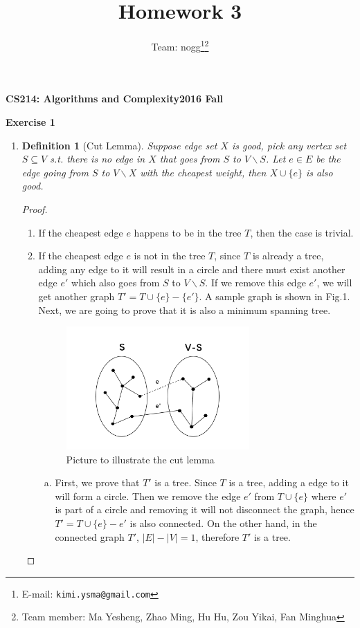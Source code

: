 \documentclass[12pt, notitlepage]{article}
\title{Homework 3}
\author{Team: nogg\footnote{E-mail: \texttt{kimi.ysma@gmail.com}}\footnote{Team member: Ma Yesheng, Zhao Ming, Hu Hu, Zou Yikai, Fan Minghua}}
\newtheorem{defi}{Definition}
\begin{document}
{\bf\small CS214: Algorithms and Complexity}\hfill{\bf\small 2016 Fall}
{\let\newpage\relax\maketitle}


\textbf{Exercise 1}
\begin{enumerate}
\item
\begin{defi}[Cut Lemma]
\vspace{-0.85cm}
Suppose edge set $X$ is good, pick any vertex set $S\subseteq V$ s.t. there is no edge in $X$ that goes from $S$ to $V\backslash S$. Let $e\in E$ be the edge going from $S$ to  $V\backslash X$ with the cheapest weight, then $X\cup \{e\}$ is also good.
\end{defi}
\begin{proof}
	\mbox{ }
\begin{enumerate}[(1)]
	\item If the cheapest edge $e$ happens to be in the tree $T$, then the case is trivial.
	\item If the cheapest edge $e$ is not in the tree $T$, since $T$ is already a tree, adding any edge to it will result in a circle and there must exist another edge $e'$ which also goes from $S$ to  $V\backslash S$. If we remove this edge $e'$, we will get another graph $T' = T\cup \{e\} -\{e'\}$. A sample graph is shown in Fig.1. Next, we are going to prove that it is also a minimum spanning tree.
	\begin{figure}[H]\centering
	\includegraphics[width=7cm]{1.png}
	\caption{Picture to illustrate the cut lemma}
	\end{figure}
	\begin{enumerate}[(a)]
		\item First, we prove that $T'$ is a tree. Since $T$ is a tree, adding a edge to it will form a circle. Then we remove the  edge $e'$ from $T\cup\{e\}$ where $e'$ is part of a circle and removing it will not disconnect the graph, hence $T' = T\cup\{e\} - e'$ is also connected. On the other hand, in the connected graph $T'$, $|E|-|V| = 1$, therefore $T'$ is a tree.

\end{enumerate}
\end{enumerate}
\end{proof}
\end{enumerate}
\end{document}
